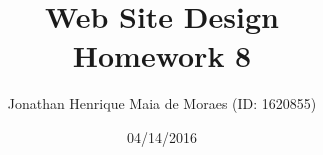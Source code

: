 \title{Web Site Design \\ Homework 8}
\author{Jonathan Henrique Maia de Moraes (ID: 1620855)}
\date{04/14/2016}
\maketitle
